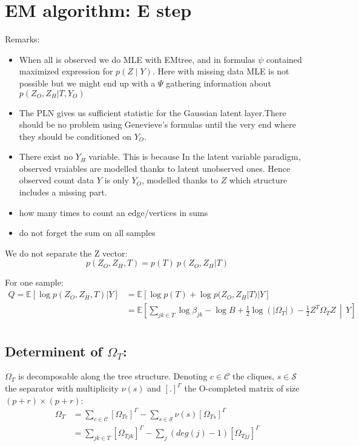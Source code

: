 \documentclass[11pt,a4paper]{article}
\newcommand{\Esp}{\mathds{E}}
\begin{document}
\section{EM algorithm: E step}

Remarks:
\begin{itemize}
\item When all is observed we do MLE with EMtree, and in formulas $\psi$ contained maximized expression for $p(Z \mid Y)$. Here with missing data MLE is not possible but we might end up with a $\Psi$ gathering information about $ p(Z_O,Z_H|T,Y_O)$
\item The PLN gives us sufficient statistic for the Gaussian latent layer.There should be no problem using Genevieve's formulas until the very end where they should be conditioned on $Y_O$.
\item There exist no $Y_H$ variable. This is because In the latent variable paradigm, observed vraiables are modelled thanks to latent unobserved ones. Hence observed count data $Y$ is only $Y_O$, modelled thanks to $Z$ which structure includes a  missing part.
\item how many times to count an edge/vertices in sums 
\item do not forget the sum on all samples
\end{itemize}



We do not separate the Z vector:
$$p(Z_O,Z_H,T) = p(T) \: p(Z_O,Z_H|T)$$

For one sample:
\begin{align*}
Q= \Esp[\log p(Z_O,Z_H,T) | Y ] &=  \Esp[\log p(T)+\log p(Z_O,Z_H|T)|Y] \\
  &=\Esp\left[\sum_{jk \in T} \log \beta_{jk} - \log B + \frac{1}{2} \log(|\Omega_T|) - \frac{1}{2} Z^T \Omega_T Z\,\middle\vert\,  Y\right]\\
\end{align*} 


\subsection{Determinent of $\Omega_T$:\\}
$\Omega_T$ is decomposable along the tree structure. Denoting $c\in\mathcal{C}$ the cliques, $s\in \mathcal{S}$ the separator with multiplicity $\nu(s)$ and $[.]^\Gamma$ the O-completed matrix of size $(p+r)\times(p+r)$:
\begin{align*}
\Omega_T &= \sum_{c\in \mathcal{C}} [\Omega_{Tc}]^\Gamma - \sum_{s \in\mathcal{S}} \nu(s)[\Omega_{Ts}]^\Gamma\\
&= \sum_{jk \in T} [\Omega_{Tjk}]^\Gamma - \sum_j (deg(j)-1)[\Omega_{Tjj}]^\Gamma
\end{align*}
\end{document}
